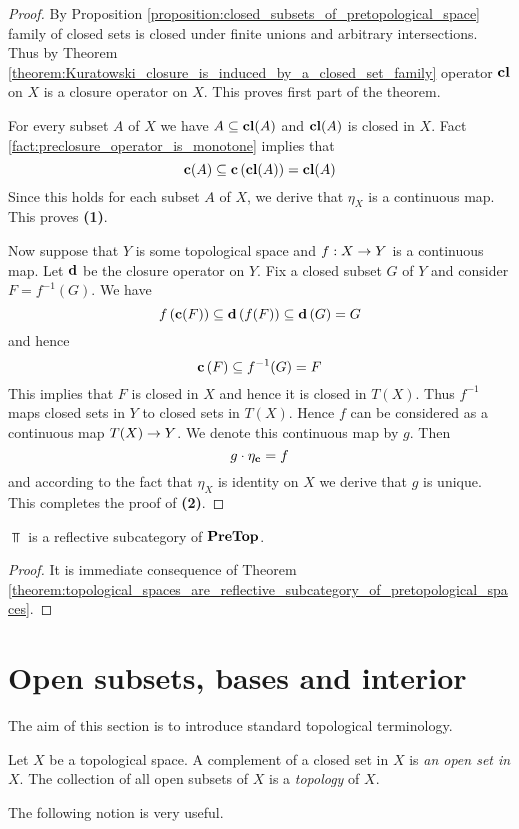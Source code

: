 \begin{proof}
	By Proposition \ref{proposition:closed_subsets_of_pretopological_space} family of closed sets is closed under finite unions and arbitrary intersections. Thus by Theorem \ref{theorem:Kuratowski_closure_is_induced_by_a_closed_set_family} operator $\mathbf{cl}$ on $X$ is a closure operator on $X$. This proves first part of the theorem.

	For every subset $A$ of $X$ we have $A \subseteq \mathbf{cl}(A)$ and $\mathbf{cl}(A)$ is closed in $X$. Fact \ref{fact:preclosure_operator_is_monotone} implies that
	$$\mathbf{c}(A) \subseteq \mathbf{c}\left(\mathbf{cl}(A)\right) = \mathbf{cl}(A)$$
	Since this holds for each subset $A$ of $X$, we derive that $\eta_{X}$ is a continuous map. This proves \textbf{(1)}.

	Now suppose that $Y$ is some topological space and $f:X \rightarrow Y$ is a continuous map. Let $\mathbf{d}$ be the closure operator on $Y$. Fix a closed subset $G$ of $Y$ and consider $F = f^{-1}(G)$. We have
	$$f\left(\mathbf{c}(F)\right) \subseteq \mathbf{d}\left(f(F)\right) \subseteq \mathbf{d}\left(G\right) = G$$
	and hence
	$$\mathbf{c}\left(F\right) \subseteq f^{-1}(G) = F$$
	This implies that $F$ is closed in $X$ and hence it is closed in $T(X)$. Thus $f^{-1}$ maps closed sets in $Y$ to closed sets in $T(X)$. Hence $f$ can be considered as a continuous map $T(X) \rightarrow Y$. We denote this continuous map by $g$. Then
	$$g\cdot \eta_{\mathbf{c}} = f$$
	and according to the fact that $\eta_{X}$ is identity on $X$ we derive that $g$ is unique. This completes the proof of \textbf{(2)}.
\end{proof}

\begin{corollary}\label{corollary:top_is_reflective_in_pretop}
	$\Top$ is a reflective subcategory of $\mathbf{PreTop}$.
\end{corollary}
\begin{proof}
	It is immediate consequence of Theorem \ref{theorem:topological_spaces_are_reflective_subcategory_of_pretopological_spaces}.
\end{proof}


\section{Open subsets, bases and interior}
\noindent
The aim of this section is to introduce standard topological terminology.

\begin{definition}
	Let $X$ be a topological space. A complement of a closed set in $X$ is \textit{an open set in $X$}. The collection of all open subsets of $X$ is a \textit{topology} of $X$.
\end{definition}
\noindent
The following notion is very useful.

